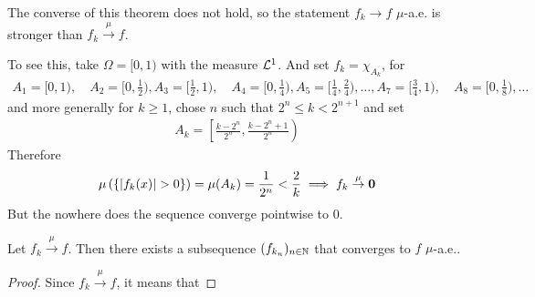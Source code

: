 \begin{rem}
The converse of this theorem does not hold, so the statement $f_k \to f$ $\mu$-a.e. is stronger than $f_k \stackrel{\mu}{\to} f$.

To see this, take $\Omega = [0,1)$ with the measure $\mathcal{L}^{1}$.
And set $f_k = \chi_{A_k}$, for
\begin{align*}
  A_1 = [0,1), \quad 
  A_2 = [0,\tfrac{1}{2}), A_3 = [\tfrac{1}{2},1), \quad 
  A_4 = [0,\tfrac{1}{4}), A_5 = [\tfrac{1}{4},\tfrac{2}{4}), \ldots, A_7 = [\tfrac{3}{4},1), \quad 
  A_8 = [0, \tfrac{1}{8}), \ldots
\end{align*}
and more generally for $k \geq 1$, chose $n$ such that $2^{n} \leq k < 2^{n+1}$ and set
\begin{align*}
  A_k = \left[\frac{k - 2^{n}}{2^{n}}, \frac{k- 2^{n}+1}{2^{n}}\right)
\end{align*}
Therefore
\begin{align*}
  \mu\left(
  \{\vert f_k(x)\vert > 0\}
\right) = \mu(A_k) = \frac{1}{2^{n}} < \frac{2}{k} \implies f_k \stackrel{\mu}{\to} \bm{0}
\end{align*}
But the nowhere does the sequence converge pointwise to $0$.
\end{rem}

\begin{thm}[]\label{thm:subsequence-muae}
  Let $f_k \stackrel{\mu}{\to} f$. Then there exists a subsequence $(f_{k_n})_{n \in \mathbb{N}}$ that converges to $f$ $\mu$-a.e..
\end{thm}
\begin{proof}
  Since $f_k \stackrel{\mu}{\to} f$, it means that 
\end{proof}

